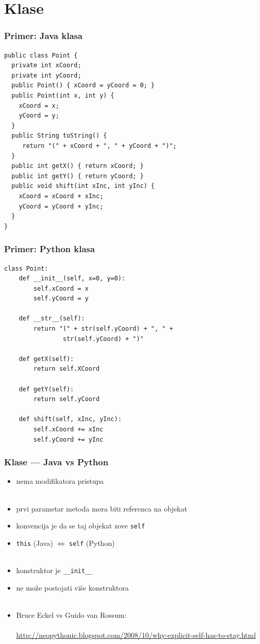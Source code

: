 \documentclass[compress]{beamer}
\begin{document}
\section{Klase}

\begin{frame}[fragile]
\frametitle{Primer: Java klasa}
\begin{verbatim}
public class Point {
  private int xCoord;
  private int yCoord;
  public Point() { xCoord = yCoord = 0; }
  public Point(int x, int y) {
    xCoord = x;
    yCoord = y;
  }
  public String toString() {
     return "(" + xCoord + ", " + yCoord + ")";
  }
  public int getX() { return xCoord; }
  public int getY() { return yCoord; }
  public void shift(int xInc, int yInc) {
    xCoord = xCoord + xInc;
    yCoord = yCoord + yInc;
  }
}
\end{verbatim}
\end{frame}

\begin{frame}[fragile]
\frametitle{Primer: Python klasa}
\begin{verbatim}
class Point:
    def __init__(self, x=0, y=0):
        self.xCoord = x
        self.yCoord = y
  
    def __str__(self):
        return "(" + str(self.yCoord) + ", " +
                str(self.yCoord) + ")"
     
    def getX(self):
        return self.XCoord
     
    def getY(self):
        return self.yCoord
     
    def shift(self, xInc, yInc):
        self.xCoord += xInc
        self.yCoord += yInc
\end{verbatim}
\end{frame}

\begin{frame}[fragile]
  \frametitle{Klase --- Java vs Python}
  \begin{itemize}
    \item nema modifikatora pristupa \\ \ \\
    \item prvi parametar metoda mora biti referenca na objekat
    \item konvencija je da se taj objekat zove \texttt{self}
    \item \texttt{this} (Java) $\Leftrightarrow$ \texttt{self} (Python)\\ \ \\
    \item konstruktor je \texttt{\_\_init\_\_}
    \item ne može postojati više konstruktora \\ \ \\
    \item Bruce Eckel vs Guido van Rossum: \\  \\ \footnotesize
      \url{http://neopythonic.blogspot.com/2008/10/why-explicit-self-has-to-stay.html}
  \end{itemize}
\end{frame}
\end{document}
